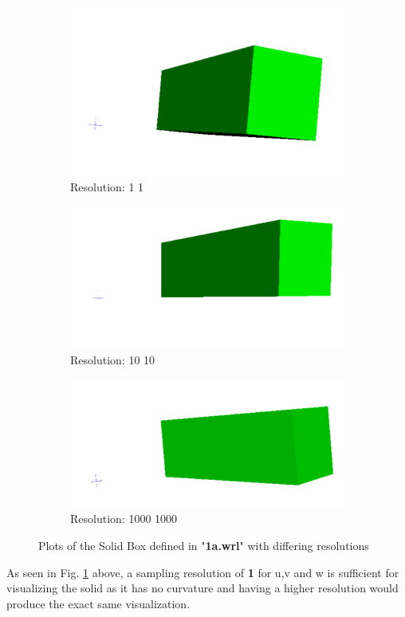 \documentclass[acmlarge,nonacm=true]{acmart}
\begin{document}
\begin{figure}[H]
	\begin{subfigure}{.33\textwidth}
	  \centering
	  \includegraphics[width=.8\linewidth]{fig/1a1_1_1}
	  \caption{Resolution: 1 1}
	\end{subfigure}%
	\begin{subfigure}{.33\textwidth}
	  \centering
	  \includegraphics[width=.8\linewidth]{fig/1a10_10_10}
	  \caption{Resolution: 10 10}
	\end{subfigure}
	\begin{subfigure}{.33\textwidth}
		\centering
		\includegraphics[width=.8\linewidth]{fig/1a100_100_100}
		\caption{Resolution: 1000 1000}
	  \end{subfigure}
	\caption{Plots of the Solid Box defined in "\textbf{1a.wrl}" with differing resolutions}
	\label{fig:1a}
\end{figure}
As seen in Fig. \ref{fig:1a} above, a sampling resolution of \textbf{1} for u,v and w is 
sufficient for visualizing the solid as it has no curvature and having a higher resolution would
produce the exact same visualization.
\end{document}

